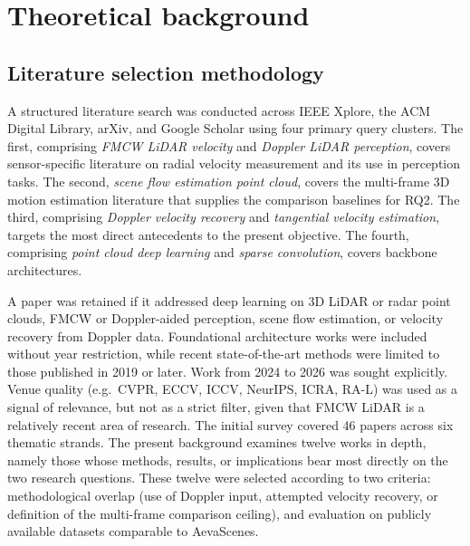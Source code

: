 \documentclass[a4paper,12pt]{article}
\begin{document}
\newpage


%

\section{Theoretical background}
\label{Background}

\subsection{Literature selection methodology}

A structured literature search was conducted across IEEE Xplore, the ACM Digital Library, arXiv, and Google Scholar using four primary query clusters. The first, comprising \textit{FMCW LiDAR velocity} and \textit{Doppler LiDAR perception}, covers sensor-specific literature on radial velocity measurement and its use in perception tasks. The second, \textit{scene flow estimation point cloud}, covers the multi-frame 3D motion estimation literature that supplies the comparison baselines for RQ2. The third, comprising \textit{Doppler velocity recovery} and \textit{tangential velocity estimation}, targets the most direct antecedents to the present objective. The fourth, comprising \textit{point cloud deep learning} and \textit{sparse convolution}, covers backbone architectures.

A paper was retained if it addressed deep learning on 3D LiDAR or radar point clouds, FMCW or Doppler-aided perception, scene flow estimation, or velocity recovery from Doppler data. Foundational architecture works were included without year restriction, while recent state-of-the-art methods were limited to those published in 2019 or later. Work from 2024 to 2026 was sought explicitly. Venue quality (e.g.\ CVPR, ECCV, ICCV, NeurIPS, ICRA, RA-L) was used as a signal of relevance, but not as a strict filter, given that FMCW LiDAR is a relatively recent area of research. The initial survey covered 46 papers across six thematic strands. The present background examines twelve works in depth, namely those whose methods, results, or implications bear most directly on the two research questions. These twelve were selected according to two criteria: methodological overlap (use of Doppler input, attempted velocity recovery, or definition of the multi-frame comparison ceiling), and evaluation on publicly available datasets comparable to AevaScenes.
\end{document}
